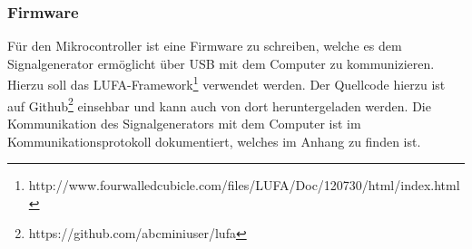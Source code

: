 \subsubsection{Firmware}
Für den Mikrocontroller ist eine Firmware zu schreiben, welche es dem Signalgenerator ermöglicht über USB mit dem Computer zu kommunizieren. Hierzu soll das LUFA-Framework\footnote{http://www.fourwalledcubicle.com/files/LUFA/Doc/120730/html/index.html} verwendet werden. Der Quellcode hierzu ist auf Github\footnote{https://github.com/abcminiuser/lufa} einsehbar und kann auch von dort heruntergeladen werden. Die Kommunikation des Signalgenerators mit dem Computer ist im Kommunikationsprotokoll dokumentiert, welches im Anhang zu finden ist.